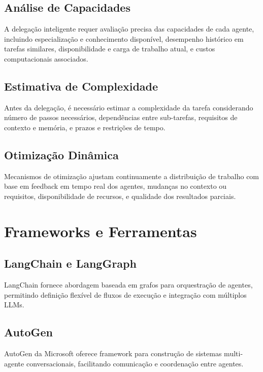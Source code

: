 \documentclass[OA,linenum]{InterPore}
\begin{document}
\subsection{Análise de Capacidades}

A delegação inteligente requer avaliação precisa das capacidades de cada agente, incluindo especialização e conhecimento disponível, desempenho histórico em tarefas similares, disponibilidade e carga de trabalho atual, e custos computacionais associados.

\subsection{Estimativa de Complexidade}

Antes da delegação, é necessário estimar a complexidade da tarefa considerando número de passos necessários, dependências entre sub-tarefas, requisitos de contexto e memória, e prazos e restrições de tempo.

\subsection{Otimização Dinâmica}

Mecanismos de otimização ajustam continuamente a distribuição de trabalho com base em feedback em tempo real dos agentes, mudanças no contexto ou requisitos, disponibilidade de recursos, e qualidade dos resultados parciais.

\section{Frameworks e Ferramentas}

\subsection{LangChain e LangGraph}

LangChain fornece abordagem baseada em grafos para orquestração de agentes, permitindo definição flexível de fluxos de execução e integração com múltiplos LLMs.

\subsection{AutoGen}

AutoGen da Microsoft oferece framework para construção de sistemas multi-agente conversacionais, facilitando comunicação e coordenação entre agentes.
\end{document}
